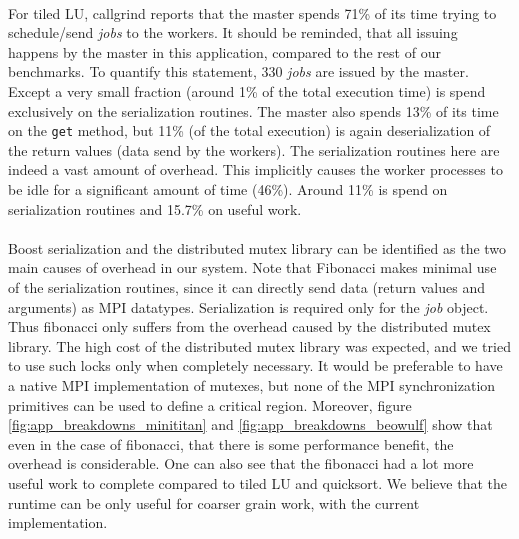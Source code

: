 \paragraph{}
For tiled LU, callgrind reports that the master spends 71\% of its time trying to schedule/send \emph{jobs} to the
workers.  It should be reminded, that all issuing happens by the master in this application, compared to the rest
of our benchmarks.  To quantify this statement, 330 \emph{jobs} are issued by the master.  Except a very small fraction
(around 1\% of the total execution time) is spend exclusively on the serialization routines.  
The master also spends 13\% of its time on the 
\texttt{get} method, but 11\% (of the total execution) is again deserialization of the return values (data send by the workers).
The serialization routines here are indeed a vast amount of overhead.  This implicitly causes the worker processes to
be idle for a significant amount of time (46\%).  Around 11\% is spend on serialization routines and 15.7\% on useful
work.

\paragraph{}
Boost serialization and the distributed mutex library can be identified as the two main causes of overhead in our system.    
Note that Fibonacci makes minimal use of the serialization routines, since it can directly send data (return values and 
arguments) as MPI datatypes.  Serialization is required only for the \emph{job} object.  Thus fibonacci only suffers from
the overhead caused by the distributed mutex library.  The high cost of the distributed mutex library was expected, and we
tried to use such locks only when completely necessary.  It would be preferable to have a native MPI implementation of 
mutexes, but none of the MPI synchronization primitives can be used to define a critical region.  Moreover, figure 
\ref{fig:app_breakdowns_minititan} and \ref{fig:app_breakdowns_beowulf} show that even in the case of fibonacci, 
that there is some performance benefit, the overhead is
considerable.  One can also see that the fibonacci had a lot more useful work to complete compared to tiled LU and 
quicksort.  We believe that the runtime can be only useful for coarser grain work, with the current implementation.


